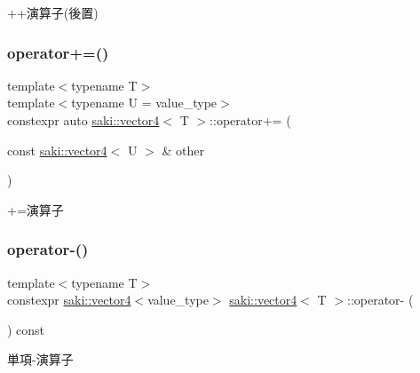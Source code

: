 ++演算子(後置) 

\mbox{\label{classsaki_1_1vector4_a2109bee349eec6cba816718ecae33070}} 
\subsubsection{\texorpdfstring{operator+=()}{operator+=()}}
{\footnotesize\ttfamily template$<$typename T$>$ \\
template$<$typename U  = value\+\_\+type$>$ \\
constexpr auto \mbox{\hyperlink{classsaki_1_1vector4}{saki\+::vector4}}$<$ T $>$\+::operator+= (\begin{DoxyParamCaption}\item[{const \mbox{\hyperlink{classsaki_1_1vector4}{saki\+::vector4}}$<$ U $>$ \&}]{other }\end{DoxyParamCaption})\hspace{0.3cm}{\ttfamily [inline]}}



+=演算子 

\mbox{\label{classsaki_1_1vector4_a24f601d217a8ad649cb0109a20baec2b}} 
\subsubsection{\texorpdfstring{operator-\/()}{operator-()}}
{\footnotesize\ttfamily template$<$typename T$>$ \\
constexpr \mbox{\hyperlink{classsaki_1_1vector4}{saki\+::vector4}}$<$value\+\_\+type$>$ \mbox{\hyperlink{classsaki_1_1vector4}{saki\+::vector4}}$<$ T $>$\+::operator-\/ (\begin{DoxyParamCaption}{ }\end{DoxyParamCaption}) const\hspace{0.3cm}{\ttfamily [inline]}}



単項-\/演算子 

\mbox{\label{classsaki_1_1vector4_a602623df1870e123f03b8948f3f0f5df}} 
